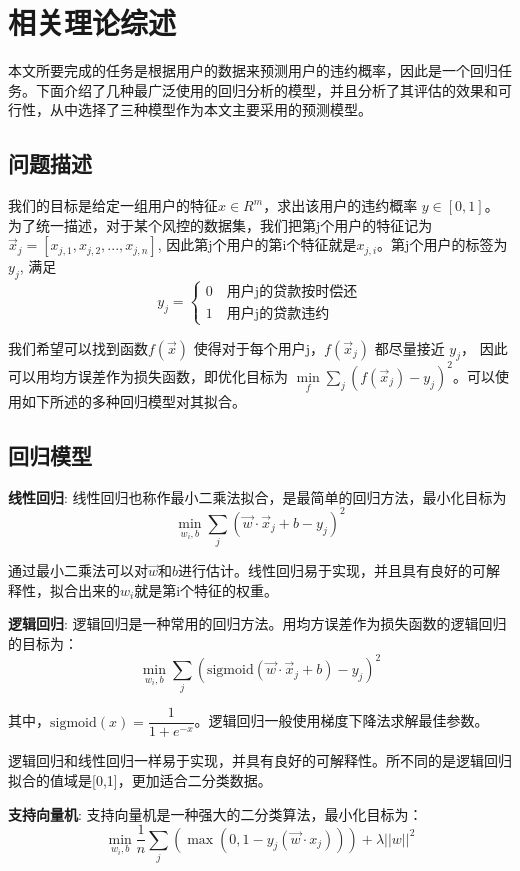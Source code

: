 \chapter{相关理论综述}
本文所要完成的任务是根据用户的数据来预测用户的违约概率，因此是一个回归任务。下面介绍了几种最广泛使用的回归分析的模型，并且分析了其评估的效果和可行性，从中选择了三种模型作为本文主要采用的预测模型。
\section{问题描述}
我们的目标是给定一组用户的特征$ x \in R^m $，求出该用户的违约概率 $ y \in [0, 1]$。
为了统一描述，对于某个风控的数据集，我们把第j个用户的特征记为$\vec x_j = [x_{j,1}, x_{j,2}, ..., x_{j,n}]$, 因此第j个用户的第i个特征就是$x_{j,i}$。第j个用户的标签为$y_j$, 满足
\[
y_j =\begin{cases}  0 \quad \text{用户j的贷款按时偿还} \\ 1 \quad \text{用户j的贷款违约} \end{cases}
\]

我们希望可以找到函数$f(\vec x)$ 使得对于每个用户j，$f(\vec x_j)$ 都尽量接近 $y_j$， 因此可以用均方误差作为损失函数，即优化目标为 $\min \limits_{f} \sum_j (f(\vec x_j) - y_j)^2$。可以使用如下所述的多种回归模型对其拟合。

\section{回归模型}

\textbf{线性回归}:
线性回归也称作最小二乘法拟合，是最简单的回归方法，最小化目标为
\[\min \limits_{w_i, b} \sum_{j} (\vec w \cdot \vec x_j + b - y_j)^2\]
 
通过最小二乘法可以对$\vec w$和$b$进行估计。线性回归易于实现，并且具有良好的可解释性，拟合出来的$w_i$就是第i个特征的权重。

\textbf{逻辑回归}:
逻辑回归是一种常用的回归方法。用均方误差作为损失函数的逻辑回归的目标为：
\[\min \limits_{w_i, b} \sum_{j} (\text{sigmoid} ( \vec w\cdot \vec x_j + b) - y_j)^2\]

其中，$ \text{sigmoid}(x) = \dfrac{1}{1+e^{-x}} $。逻辑回归一般使用梯度下降法求解最佳参数。

逻辑回归和线性回归一样易于实现，并具有良好的可解释性。所不同的是逻辑回归拟合的值域是[0,1]，更加适合二分类数据。

\textbf{支持向量机}:
支持向量机\cite{scholkopf2001svm}是一种强大的二分类算法，最小化目标为：
\[ \min \limits_{w_i, b} \dfrac{1}{n} \sum_{j}(\max(0, 1-y_j(\vec w \cdot x_j))) + \lambda ||w||^2  \]

